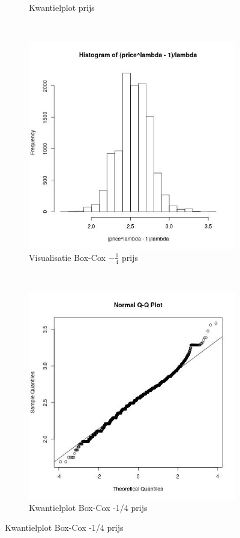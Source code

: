 \documentclass[a4paper,kulak]{kulakarticle} %
\begin{document}
\begin{figure}[H]
\begin{subfigure}[b]{0.45\textwidth}
		\caption{Kwantielplot prijs}
		\label{fig:qqp}
	\end{subfigure}
	~
	\begin{subfigure}[b]{0.45\textwidth}
		\includegraphics[width=\textwidth]{prijsB.jpg}
		\caption{Visualisatie Box-Cox  $-\frac{1}{4}$ prijs}
		\label{fig:bpv}
	\end{subfigure}
	~ %
	\begin{subfigure}[b]{0.45\textwidth}
		\includegraphics[width=\textwidth]{qqbp.jpg}
		\caption{Kwantielplot Box-Cox -1/4 prijs}
		\label{fig:qqbp}
	\end{subfigure}
\end{figure}
\end{document}
